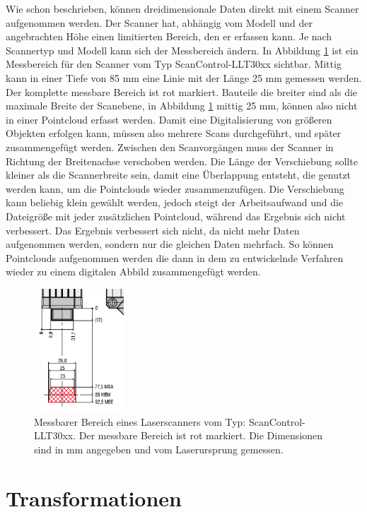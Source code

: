 Wie schon beschrieben, können dreidimensionale Daten direkt mit einem 
Scanner aufgenommen werden. 
Der Scanner hat, abhängig vom Modell und der angebrachten Höhe einen limitierten
Bereich, den er erfassen kann. 
Je nach Scannertyp und Modell kann sich der Messbereich ändern.
In Abbildung \ref{fig:scanner} ist ein Messbereich für den Scanner vom Typ 
ScanControl-LLT30xx sichtbar. Mittig kann 
in einer Tiefe von 85 mm eine Linie mit der Länge 25 mm gemessen werden. 
Der komplette messbare Bereich ist rot markiert. \cite{MESSTECHNIK_2020}
Bauteile die breiter sind als die maximale Breite der Scanebene, in Abbildung 
\ref{fig:scanner} mittig 25 mm, können also nicht in einer Pointcloud erfasst werden. 
Damit eine Digitalisierung von größeren Objekten erfolgen kann, müssen
also mehrere Scans durchgeführt, und später zusammengefügt werden. Zwischen den 
Scanvorgängen muss der Scanner in Richtung der Breitenachse verschoben werden.
Die Länge der Verschiebung sollte kleiner als die Scannerbreite sein, 
damit eine Überlappung entsteht, die 
genutzt werden kann, um die Pointclouds wieder zusammenzufügen. Die Verschiebung kann 
beliebig klein gewählt werden, jedoch steigt der Arbeitsaufwand und die Dateigröße mit 
jeder zusätzlichen Pointcloud, während das Ergebnis sich nicht verbessert.
Das Ergebnis verbessert sich nicht, da nicht mehr Daten aufgenommen werden, sondern nur 
die gleichen Daten mehrfach.
So können Pointclouds aufgenommen werden die dann in dem zu entwickelnde Verfahren
wieder zu einem digitalen Abbild zusammengefügt werden.

\begin{figure}[h]
    \centering
    \includegraphics[width=0.3\textwidth]{images/Scanner.PNG}
    \caption{Messbarer Bereich eines Laserscanners vom Typ: ScanControl-LLT30xx.
    Der messbare Bereich ist rot markiert. Die Dimensionen sind in mm angegeben 
    und vom Laserursprung gemessen.}
    \label{fig:scanner}
\end{figure}

\section{Transformationen} \label{Transformation}

